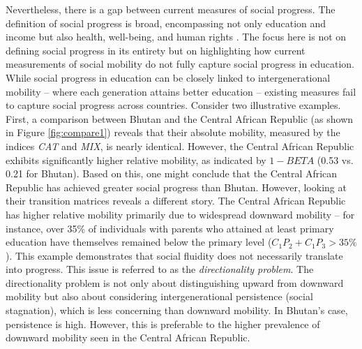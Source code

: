 Nevertheless, there is a gap between current measures of social progress. The definition of social progress is broad, encompassing not only education and income but also health, well-being, and human rights \citep{narayan2018fair, blanden2013cross, deutscher2023measuring}. The focus here is not on defining social progress in its entirety but on highlighting how current measurements of social mobility do not fully capture social progress in education. While social progress in education can be closely linked to intergenerational mobility -- where each generation attains better education -- existing measures fail to capture social progress across countries. Consider two illustrative examples. First, a comparison between Bhutan and the Central African Republic (as shown in Figure \ref{fig:compare1}) reveals that their absolute mobility, measured by the indices \textit{CAT} and \textit{MIX}, is nearly identical. However, the Central African Republic exhibits significantly higher relative mobility, as indicated by $1 - BETA$ (0.53 vs. 0.21 for Bhutan). Based on this, one might conclude that the Central African Republic has achieved greater social progress than Bhutan. However, looking at their transition matrices reveals a different story. The Central African Republic has higher relative mobility primarily due to widespread downward mobility -- for instance, over 35\% of individuals with parents who attained at least primary education have themselves remained below the primary level ($C_1P_2 + C_1P_3 > 35\%$). This example demonstrates that social fluidity does not necessarily translate into progress. This issue is referred to as the \textit{directionality problem}. The directionality problem is not only about distinguishing upward from downward mobility but also about considering intergenerational persistence (social stagnation), which is less concerning than downward mobility. In Bhutan’s case, persistence is high. However, this is preferable to the higher prevalence of downward mobility seen in the Central African Republic.

